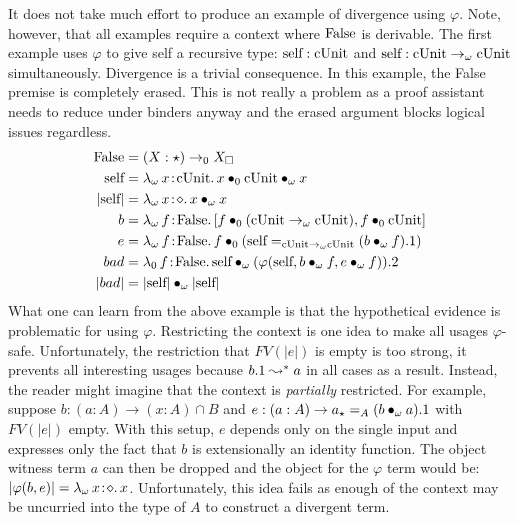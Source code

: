 It does not take much effort to produce an example of divergence using $\varphi$.
Note, however, that all examples require a context where $\textnormal{False}$ is derivable.
The first example uses $\varphi$ to give self a recursive type: $\textnormal{self} : \textnormal{cUnit}$ and $\textnormal{self} : \textnormal{cUnit} \to_\omega \textnormal{cUnit}$ simultaneously.
Divergence is a trivial consequence.
In this example, the False premise is completely erased.
This is not really a problem as a proof assistant needs to reduce under binders anyway and the erased argument blocks logical issues regardless.
\begin{align*}
    \pFalse &= (X : \star) \to_0 X_\square \\
    \pself &= \abs{\lambda_\omega}{x}{\pUnit}{
        \apptwo{x}{0}{\pUnit}{\omega}{x}
    } \\
    |\pself| &= \abs{\lambda_\omega}{x}{\diamond}{\app{x}{\omega}{x}} \\
    b &= \abs{\lambda_\omega}{f}{\pFalse}{
        [
            \app{f}{0}{(\pUnit \to_\omega \pUnit)},
            \app{f}{0}{\pUnit}
        ]
    } \\
    e &= \abs{\lambda_\omega}{f}{\pFalse}{
        \app{f}{0}{
            (\pself =_{\pUnit \to_\omega \pUnit} (\app{b}{\omega}{f}).1)
        }
    } \\
    bad &= \abs{\lambda_0}{f}{\pFalse}{
        \app{\pself}{\omega}{
            (
                \varphi(\pself, \app{b}{\omega}{f}, \app{e}{\omega}{f})
            ).2
        }
    } \\
    |bad| &= \app{|\pself|}{\omega}{|\pself|}
\end{align*}
What one can learn from the above example is that the hypothetical evidence is problematic for using $\varphi$.
Restricting the context is one idea to make all usages $\varphi$-safe.
Unfortunately, the restriction that $FV(|e|)$ is empty is too strong, it prevents all interesting usages because $b.1 \leadsto^* a$ in all cases as a result.
Instead, the reader might imagine that the context is \textit{partially} restricted.
For example, suppose $b : (a : A) \to (x : A) \cap B$ and $e : (a : A) \to a_\star =_A (b \bullet_{\omega} a).1$ with $FV(|e|)$ empty.
With this setup, $e$ depends only on the single input and expresses only the fact that $b$ is extensionally an identity function.
The object witness term $a$ can then be dropped and the object for the $\varphi$ term would be: $|\varphi(b, e)| = {\lambda_\omega}\, x\! : \! \diamond.\, x$.
Unfortunately, this idea fails as enough of the context may be uncurried into the type of $A$ to construct a divergent term.
